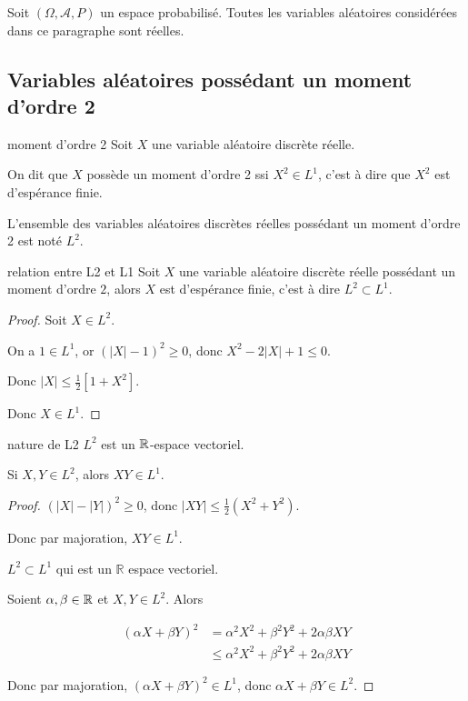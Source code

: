 Soit $(\Omega, \mathcal A, P)$ un espace probabilisé. Toutes les variables aléatoires 
considérées dans ce paragraphe sont réelles. 

\subsection{Variables aléatoires possédant un moment d'ordre 2 }

\begin{definition}{moment d'ordre 2}{}
    Soit $X$ une variable aléatoire discrète réelle. 

    On dit que $X$ possède un moment d'ordre 2 ssi $X^2 \in L^1$, c'est à dire que
    $X^2$ est d'espérance finie.

    L'ensemble des variables aléatoires discrètes réelles possédant un moment d'ordre 2 
    est noté $L^2$.
\end{definition}



\begin{proposition}{relation entre L2 et L1}{}
    Soit $X$ une variable aléatoire discrète réelle possédant un moment d'ordre $2$, 
    alors $X$ est d'espérance finie, c'est à dire $L^2 \subset L^1$.
\end{proposition}

\begin{proof}
    Soit $X \in L^2$. 

    On a $1 \in L^1$, or $(|X| -1 )^2 \geqslant 0$, donc 
    $X^2 - 2 |X| + 1 \leqslant 0$. 

    Donc $|X| \leqslant \frac 1 2[1 + X^2]$. 

    Donc $X \in L^1$. 
\end{proof}

\begin{proposition}{nature de L2}{}
    $L^2$ est un $\mathbb{R}$-espace vectoriel. 
\end{proposition}

 Si $X, Y \in L^2$, alors $XY \in L^1$.


\begin{proof}
    $(|X| - |Y|)^2 \geqslant 0$, donc $|XY| \leqslant \frac 1 2 (X^2 + Y^2)$.

    Donc par majoration, $XY \in L^1$.

    $L^2 \subset L^1$ qui est un $\mathbb R$ espace vectoriel. 

    Soient $\alpha, \beta \in \mathbb{R}$ et $X, Y \in L^2$. Alors 

    \begin{align}
        (\alpha X + \beta Y)^2 & = \alpha^2 X^2 + \beta^2 Y^2 + 2 \alpha \beta XY \\
        & \leqslant \alpha^2 X^2 + \beta^2 Y^2 + 2 \alpha \beta XY
    \end{align}

    Donc par majoration, $(\alpha X + \beta Y)^2 \in L^1$, donc $\alpha X + \beta Y \in L^2$.
\end{proof}

